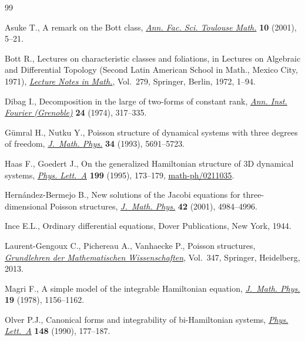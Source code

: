 \begin{thebibliography}{99}
\footnotesize\itemsep=0pt

Asuke T., A remark on the {B}ott class, \href{https://doi.org/10.5802/afst.981}{\textit{Ann. Fac. Sci. Toulouse Math.}}
 \textbf{10} (2001), 5--21.

Bott R., Lectures on characteristic classes and foliations, in Lectures on
 Algebraic and Dif\/ferential Topology ({S}econd {L}atin {A}merican {S}chool in
 {M}ath., {M}exico {C}ity, 1971), \href{https://doi.org/10.1007/BFb0058509}{\textit{Lecture Notes in Math.}}, Vol.~279,
 Springer, Berlin, 1972, 1--94.

Dibag I., Decomposition in the large of two-forms of constant rank,
 \href{https://doi.org/10.5802/aif.529}{\textit{Ann. Inst. Fourier (Grenoble)}} \textbf{24} (1974), 317--335.

G\"umral H., Nutku Y., Poisson structure of dynamical systems with three
 degrees of freedom, \href{https://doi.org/10.1063/1.530278}{\textit{J.~Math. Phys.}} \textbf{34} (1993), 5691--5723.

Haas F., Goedert J., On the generalized {H}amiltonian structure of {$3$}{D}
 dynamical systems, \href{https://doi.org/10.1016/0375-9601(95)00113-H}{\textit{Phys. Lett.~A}} \textbf{199} (1995), 173--179,
 \href{https://arxiv.org/abs/math-ph/0211035}{math-ph/0211035}.

Hern\'andez-Bermejo B., New solutions of the {J}acobi equations for
 three-dimensional {P}oisson structures, \href{https://doi.org/10.1063/1.1402174}{\textit{J.~Math. Phys.}} \textbf{42}
 (2001), 4984--4996.

Ince E.L., Ordinary dif\/ferential equations, Dover Publications, New York, 1944.

Laurent-Gengoux C., Pichereau A., Vanhaecke P., Poisson structures,
 \href{https://doi.org/10.1007/978-3-642-31090-4}{\textit{Grundlehren der Mathematischen Wissenschaften}}, Vol.~347, Springer,
 Heidelberg, 2013.

Magri F., A simple model of the integrable {H}amiltonian equation,
 \href{https://doi.org/10.1063/1.523777}{\textit{J.~Math. Phys.}} \textbf{19} (1978), 1156--1162.

Olver P.J., Canonical forms and integrability of bi-{H}amiltonian systems,
 \href{https://doi.org/10.1016/0375-9601(90)90775-J}{\textit{Phys. Lett.~A}} \textbf{148} (1990), 177--187.


\end{thebibliography}
